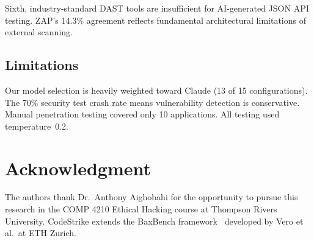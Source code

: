 \documentclass[conference,a4paper]{IEEEtran}
\begin{document}
Sixth, industry-standard DAST tools are insufficient for AI-generated JSON API testing. ZAP's 14.3\% agreement reflects fundamental architectural limitations of external scanning.

\subsection{Limitations}
Our model selection is heavily weighted toward Claude (13 of 15 configurations). The 70\% security test crash rate means vulnerability detection is conservative. Manual penetration testing covered only 10 applications. All testing used temperature~0.2.

\section*{Acknowledgment}
The authors thank Dr.\ Anthony Aighobahi for the opportunity to pursue this research in the COMP 4210 Ethical Hacking course at Thompson Rivers University. CodeStrike extends the BaxBench framework~\cite{vero2025} developed by Vero et al.\ at ETH Zurich.
\end{document}
